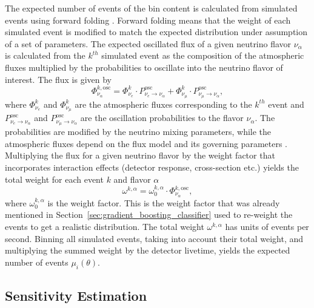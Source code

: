 The expected number of events of the bin content is calculated from simulated events using forward folding \cite{ATerliuk}.
Forward folding means that the weight of each simulated event is modified to match the expected distribution under assumption of a set of parameters.
The expected oscillated flux of a given neutrino flavor $\nu_\alpha$ is calculated from the $k^{th}$ simulated event as the composition of the atmospheric fluxes multiplied by the probabilities to oscillate into the neutrino flavor of interest.
The flux is given by
\begin{equation}
    \Phi_{\nu_\alpha}^{k,{\mathrm{osc}}} = \Phi_{\nu_e}^{k}\cdot P^\mathrm{osc}_{\nu_e\rightarrow\nu_\alpha} + \Phi_{\nu_\mu}^{k}\cdot P^\mathrm{osc}_{\nu_\mu\rightarrow\nu_\alpha},
    \label{eq:neutrino_flux}
\end{equation}
where $\Phi_{\nu_e}^{k}$ and $\Phi_{\nu_\mu}^{k}$ are the atmospheric fluxes corresponding to the $k^{th}$ event and $P^\mathrm{osc}_{\nu_e\rightarrow\nu_\alpha}$ and $P^\mathrm{osc}_{\nu_\mu\rightarrow\nu_\alpha}$ are the oscillation probabilities to the flavor $\nu_\alpha$.
The probabilities are modified by the neutrino mixing parameters, while the atmospheric fluxes depend on the flux model and its governing parameters \cite{PhysRevD.92.023004_Honda_Flux}.
Multiplying the flux for a given neutrino flavor by the weight factor that incorporates interaction effects (detector response, cross-section etc.) yields the total weight for each event $k$ and flavor $\alpha$
\begin{equation}
    \omega^{k,\alpha} = \omega_0^{k,\alpha} \cdot \Phi_{\nu_\alpha}^{k,{\mathrm{osc}}},
    \label{eq:total_weight}
\end{equation}
where $\omega_0^{k,\alpha}$ is the weight factor. This is the weight factor that was already mentioned in Section~\ref{sec:gradient_boosting_classifier} used to re-weight the events to get a realistic distribution.
The total weight $\omega^{k,\alpha}$ has units of events per second. Binning all simulated events, taking into account their total weight, and multiplying the summed weight by the detector livetime, yields the expected number of events $\mu_i(\theta)$.


\subsection{Sensitivity Estimation} \label{sec:uncertainty_estimation}

